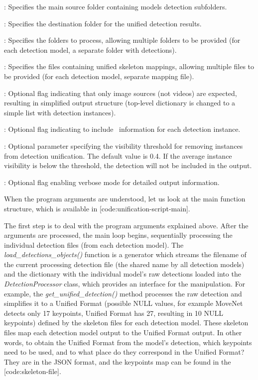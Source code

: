 \startitemize
 \item {}: Specifies the main source folder containing models detection subfolders.
 \item {}: Specifies the destination folder for the unified detection results.
 \item {}: Specifies the folders to process, allowing multiple folders to be provided (for each detection model, a separate folder with detections).
 \item {}: Specifies the files containing unified skeleton mappings, allowing multiple files to be provided (for each detection model, separate mapping file).
 \item {}: Optional flag indicating that only image sour\-ces (not videos) are expected, resulting in simplified output structure (top-level dictionary is changed to a simple list with detection instances).
 \item {}: Optional flag indicating to include \BBOX\ information for each detection instance.
 \item {}: Optional parameter specifying the visibility threshold for removing instances from detection unification. The default value is 0.4. If the average instance visibility is below the threshold, the detection will not be included in the output.
 \item {}: Optional flag enabling verbose mode for detailed output information.
\stopitemize

When the program arguments are understood, let us look at the main function structure, which is available in [code:unification-script-main].


The first step is to deal with the program arguments explained above. After the arguments are processed, the main loop begins, sequentially processing the individual detection files (from each detection model). The {\it load_detections_objects()} function is a generator which streams the filename of the current processing detection file (the shared name by all detection models) and the dictionary with the individual model's raw detections loaded into the {\it DetectionProcessor} class, which provides an interface for the manipulation. For example, the {\it get_unified_detection()} method processes the raw detection and simplifies it to a Unified Format (possible NULL values, for example MoveNet detects only 17 keypoints, Unified Format has 27, resulting in 10 NULL keypoints) defined by the skeleton files for each detection model. These skeleton files map each detection model output to the Unified Format output. In other words, to obtain the Unified Format from the model's detection, which keypoints need to be used, and to what place do they correspond in the Unified Format? They are in the JSON format, and the keypoints map can be found in the [code:skeleton-file].

